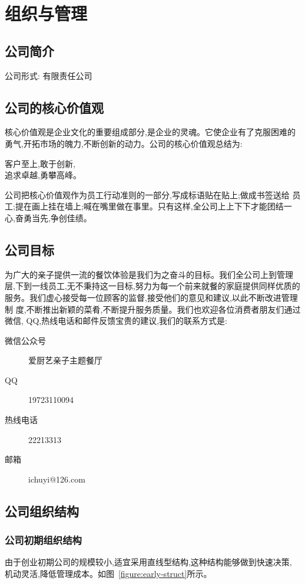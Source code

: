 \chapter{组织与管理}
\section{公司简介}
公司形式: 有限责任公司

\section{公司的核心价值观}
核心价值观是企业文化的重要组成部分,是企业的灵魂。它使企业有了克服困难的
勇气,开拓市场的魄力,不断创新的动力。公司的核心价值观总结为:
\begin{center}
        客户至上,敢于创新,\\追求卓越,勇攀高峰。
\end{center}
公司把核心价值观作为员工行动准则的一部分,写成标语贴在贴上;做成书签送给
员工;提在画上挂在墙上;喊在嘴里做在事里。只有这样,全公司上上下下才能团结一
心,奋勇当先,争创佳绩。

\section{公司目标}
为广大的亲子提供一流的餐饮体验是我们为之奋斗的目标。我们全公司上到管理
层,下到一线员工,无不秉持这一目标,努力为每一个前来就餐的家庭提供同样优质的
服务。我们虚心接受每一位顾客的监督,接受他们的意见和建议,以此不断改进管理制
度,不断推出新颖的菜肴,不断提升服务质量。我们也欢迎各位消费者朋友们通过微信,
QQ,热线电话和邮件反馈宝贵的建议,我们的联系方式是:
\begin{description}
        \item[微信公众号] 爱厨艺亲子主题餐厅
        \item[QQ] 19723110094
        \item[热线电话] 22213313
        \item[邮箱] ichuyi@126.com
\end{description}

\section{公司组织结构}
\subsection{公司初期组织结构}
由于创业初期公司的规模较小,适宜采用直线型结构,这种结构能够做到快速决策,
机动灵活,降低管理成本。如图~\ref{figure:early-struct}所示。

